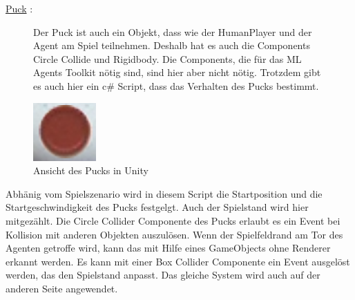 \underline{Puck} :

\begin{figure} [h]

\begin{minipage}[t]{0.6\textwidth}
\vspace{0pt}
Der Puck ist auch ein Objekt, dass wie der HumanPlayer und der Agent am Spiel teilnehmen. Deshalb hat es auch die Components Circle Collide und Rigidbody.  Die Components, die für das ML Agents Toolkit nötig sind, sind hier aber nicht nötig. Trotzdem gibt es auch hier ein c\# Script, dass das Verhalten des Pucks bestimmt.
\end{minipage}
\hspace{0.1\textwidth}
\begin{minipage}[t]{0.2\textwidth}
\vspace{0pt}
\includegraphics[width=\textwidth]{images/puck_unity}
 \caption{Ansicht des Pucks in Unity}
 \label{unity_puck}
\end{minipage}
\end{figure}
Abhänig vom Spielszenario wird in diesem Script die Startposition und die Startgeschwindigkeit des Pucks festgelgt. Auch der Spielstand wird hier mitgezählt. Die Circle Collider Componente  des Pucks erlaubt es ein Event bei Kollision mit anderen Objekten auszulösen. Wenn der Spielfeldrand am Tor des  Agenten getroffe wird, kann das mit Hilfe eines GameObjects ohne Renderer erkannt werden. Es kann mit einer Box Collider Componente ein Event ausgelöst werden, das den Spielstand anpasst. Das gleiche System wird auch auf der anderen Seite angewendet. \\

